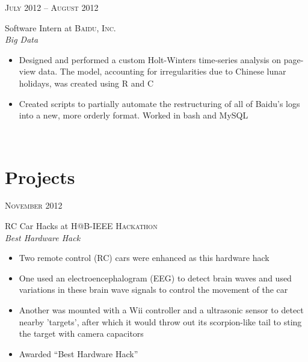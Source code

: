\documentclass[10pt]{article} %
\begin{document}
{\begin{minipage}[t]{0.5\textwidth}

{\raggedleft\textsc{July 2012 -- August 2012}\par}

{\raggedright\large Software Intern at \textsc{Baidu, Inc.}\\
\textit{Big Data}\\[5pt]}

\normalsize{
  \begin{itemize}
  \item Designed and performed a custom Holt-Winters time-series analysis
    on page-view data. The model, accounting for irregularities due to
    Chinese lunar holidays, was created using R and C
  \item Created scripts to partially automate the restructuring of all of
    Baidu's logs into a new, more orderly format. Worked in bash and MySQL
  \end{itemize}
}\\


\section{Projects} 


{\raggedleft\textsc{November 2012}\par}

{\raggedright\large RC Car Hacks at \textsc{H@B-IEEE Hackathon}\\
\textit{Best Hardware Hack}\\[5pt]}

\normalsize{
  \begin{itemize}
  \item Two remote control (RC) cars were enhanced as this hardware hack
  \item One used an electroencephalogram (EEG) to detect brain waves and
    used variations in these brain wave signals to control the movement of
    the car
  \item Another was mounted with a Wii controller and a ultrasonic sensor
    to detect nearby 'targets', after which it would throw out its
    scorpion-like tail to sting the target with camera capacitors
  \item Awarded ``Best Hardware Hack''
  \end{itemize}
}\\


\end{minipage}}
\end{document}
